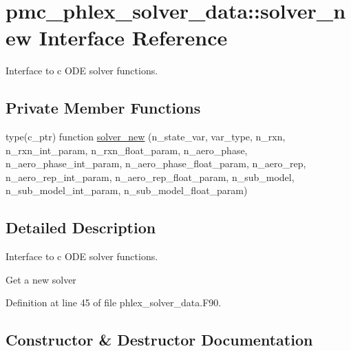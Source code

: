 \hypertarget{interfacepmc__phlex__solver__data_1_1solver__new}{}\section{pmc\+\_\+phlex\+\_\+solver\+\_\+data\+:\+:solver\+\_\+new Interface Reference}
\label{interfacepmc__phlex__solver__data_1_1solver__new}


Interface to c O\+DE solver functions.  


\subsection*{Private Member Functions}
\begin{DoxyCompactItemize}
\item 
type(c\+\_\+ptr) function \mbox{\hyperlink{interfacepmc__phlex__solver__data_1_1solver__new_a365b40460dbd0867c5a10f63a1b7a897}{solver\+\_\+new}} (n\+\_\+state\+\_\+var, var\+\_\+type, n\+\_\+rxn, n\+\_\+rxn\+\_\+int\+\_\+param, n\+\_\+rxn\+\_\+float\+\_\+param, n\+\_\+aero\+\_\+phase, n\+\_\+aero\+\_\+phase\+\_\+int\+\_\+param, n\+\_\+aero\+\_\+phase\+\_\+float\+\_\+param, n\+\_\+aero\+\_\+rep, n\+\_\+aero\+\_\+rep\+\_\+int\+\_\+param, n\+\_\+aero\+\_\+rep\+\_\+float\+\_\+param, n\+\_\+sub\+\_\+model, n\+\_\+sub\+\_\+model\+\_\+int\+\_\+param, n\+\_\+sub\+\_\+model\+\_\+float\+\_\+param)
\end{DoxyCompactItemize}


\subsection{Detailed Description}
Interface to c O\+DE solver functions. 

Get a new solver 

Definition at line 45 of file phlex\+\_\+solver\+\_\+data.\+F90.



\subsection{Constructor \& Destructor Documentation}
\mbox{\label{interfacepmc__phlex__solver__data_1_1solver__new_a365b40460dbd0867c5a10f63a1b7a897}} 
